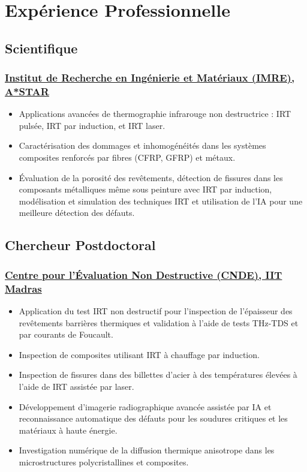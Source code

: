 \documentclass{my_cv}%
\begin{document}
\section{Expérience Professionnelle}
\vspace{1.0em}
\subsection{Scientifique}
\subsubsection{\href{https://www.a-star.edu.sg/imre}{Institut de Recherche en Ingénierie et Matériaux (IMRE), A*STAR}}
\begin{itemize}[leftmargin=0.15in]
\setlength\itemsep{-0.1em}
\color{mygray}
\item Applications avancées de thermographie infrarouge non destructrice : IRT pulsée, IRT par induction, et IRT laser.
\item Caractérisation des dommages et inhomogénéités dans les systèmes composites renforcés par fibres (CFRP, GFRP) et métaux.
\item Évaluation de la porosité des revêtements, détection de fissures dans les composants métalliques même sous peinture avec IRT par induction, modélisation et simulation des techniques IRT et utilisation de l'IA pour une meilleure détection des défauts.
\end{itemize}
{\color{mygray1} \hdashrule[0.1ex]{18.8cm}{0.2mm}{1mm}}
\subsection{Chercheur Postdoctoral}
\subsubsection{\href{https://www.cnde.in/}{Centre pour l'Évaluation Non Destructive (CNDE), IIT Madras}}
\begin{itemize}[leftmargin=0.15in]
\setlength\itemsep{-0.1em}
\color{mygray}
\item Application du test IRT non destructif pour l'inspection de l'épaisseur des revêtements barrières thermiques et validation à l'aide de tests THz-TDS et par courants de Foucault.
\item Inspection de composites utilisant IRT à chauffage par induction.
\item Inspection de fissures dans des billettes d'acier à des températures élevées à l'aide de IRT assistée par laser.
\item Développement d'imagerie radiographique avancée assistée par IA et reconnaissance automatique des défauts pour les soudures critiques et les matériaux à haute énergie.
\item Investigation numérique de la diffusion thermique anisotrope dans les microstructures polycristallines et composites.
\end{itemize}
{\color{mygray1} \hdashrule[0.1ex]{18.8cm}{0.2mm}{1mm}}
\end{document}
